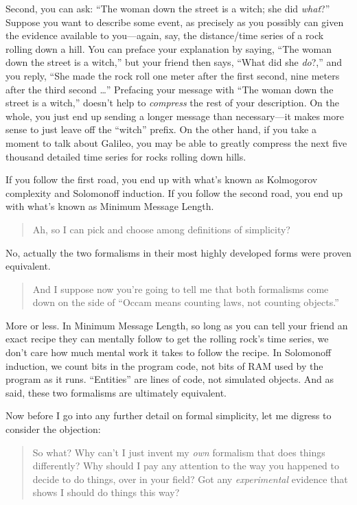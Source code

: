 {
 Second, you can ask: ``The woman down the street
is a witch; she did \textit{what}?'' Suppose you want
to describe some event, as precisely as you possibly can given the
evidence available to you---again, say, the distance/time series of a
rock rolling down a hill. You can preface your explanation by saying,
``The woman down the street is a
witch,'' but your friend then says,
``What did she \textit{do}?,'' and
you reply, ``She made the rock roll one meter after
the first second, nine meters after the third second
\ldots'' Prefacing your message with
``The woman down the street is a
witch,'' doesn't help to
\textit{compress} the rest of your description. On the whole, you just
end up sending a longer message than necessary---it makes more sense to
just leave off the ``witch'' prefix.
On the other hand, if you take a moment to talk about Galileo, you may
be able to greatly compress the next five thousand detailed time series
for rocks rolling down hills.}

{
 If you follow the first road, you end up with
what's known as Kolmogorov complexity and Solomonoff
induction. If you follow the second road, you end up with
what's known as Minimum Message Length.}

\begin{quote}
{
  Ah, so I can pick and choose among definitions of simplicity?}
\end{quote}

{
 No, actually the two formalisms in their most highly developed
forms were proven equivalent.}

\begin{quote}
{
 And I suppose now you're going to tell me that
both formalisms come down on the side of ``Occam means
counting laws, not counting objects.''}
\end{quote}

{
 More or less. In Minimum Message Length, so long as you can tell
your friend an exact recipe they can mentally follow to get the rolling
rock's time series, we don't care how
much mental work it takes to follow the recipe. In Solomonoff
induction, we count bits in the program code, not bits of RAM used by
the program as it runs. ``Entities''
are lines of code, not simulated objects. And as said, these two
formalisms are ultimately equivalent.}

{
 Now before I go into any further detail on formal simplicity, let
me digress to consider the objection:}

\begin{quote}
{
 So what? Why can't I just invent my \textit{own}
formalism that does things differently? Why should I pay any attention
to the way you happened to decide to do things, over in your field? Got
any \textit{experimental} evidence that shows I should do things this
way?}
\end{quote}

